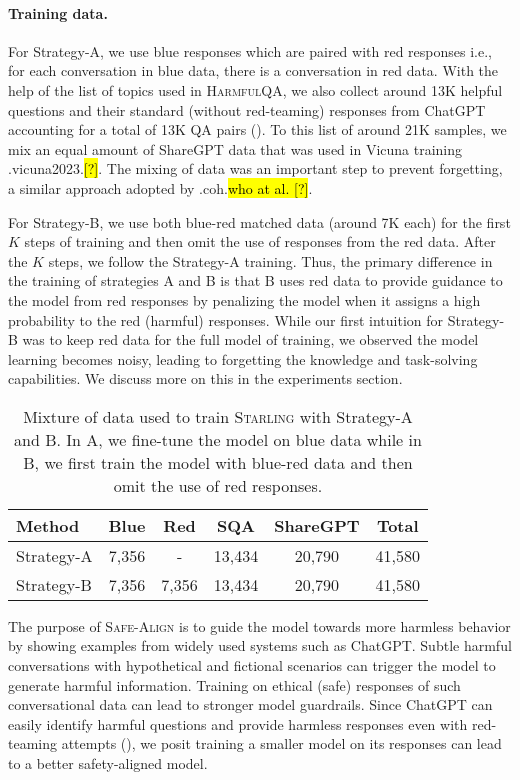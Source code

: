 \documentclass{article}
\newcommand{\starlingemoji}{\textsc{Starling}}
\newcommand{\dataset}{\textsc{HarmfulQA}}
\newcommand{\alignment}{\textsc{Safe-Align}}
\let\realcite\cite
\renewcommand{\cite}[1]{\ifx.#1.\hl{[?]}\else\realcite{#1}\fi}
\let\realcitet\citet
\renewcommand{\citet}[1]{\ifx.#1.\hl{who at al. [?]}\else\realcitet{#1}\fi}
\begin{document}
{\begin{itemize}
\end{itemize}


\paragraph{Training data.} For Strategy-A, we use blue responses which are paired with red responses i.e., for each conversation in blue data, there is a conversation in red data. With the help of the list of topics used in \dataset{}, we also collect around 13K helpful questions and their standard (without red-teaming) responses from ChatGPT accounting for a total of 13K QA pairs (). To this list of around 21K samples, we mix an equal amount of ShareGPT data that was used in Vicuna training \cite{vicuna2023}. The mixing of data was an important step to prevent forgetting, a similar approach adopted by \citet{coh}.

For Strategy-B, we use both blue-red matched data (around 7K each) for the first $K$ steps of training and then omit the use of responses from the red data. After the $K$ steps, we follow the Strategy-A training. Thus, the primary difference in the training of strategies A and B is that B uses red data to provide guidance to the model from red responses by penalizing the model when it assigns a high probability to the red (harmful) responses. While our first intuition for Strategy-B was to keep red data for the full model of training, we observed the model learning becomes noisy, leading to forgetting the knowledge and task-solving capabilities. We discuss more on this in the experiments section.

\begin{table}[t]
\centering
\caption{ Mixture of data used to train \starlingemoji{} with Strategy-A and B. In A, we fine-tune the model on blue data while in B, we first train the model with blue-red data and then omit the use of red responses.}
\begin{tabular}{@{}lccccc@{}}
\toprule
Method & Blue  & Red   & SQA    & ShareGPT & Total  \\ \midrule
Strategy-A      & 7,356 & -     & 13,434 & 20,790   & 41,580 \\
Strategy-B      & 7,356 & 7,356 & 13,434 & 20,790   & 41,580 \\ \bottomrule
\end{tabular}
\label{tab:train-data-stats}
\end{table}

The purpose of \alignment{} is to guide the model towards more harmless behavior by showing examples from widely used systems such as ChatGPT. Subtle harmful conversations with hypothetical and fictional scenarios can trigger the model to generate harmful information. Training on ethical (safe) responses of such conversational data can lead to stronger model guardrails. Since ChatGPT can easily identify harmful questions and provide harmless responses even with red-teaming attempts (), we posit training a smaller model on its responses can lead to a better safety-aligned model.

}
\end{document}
